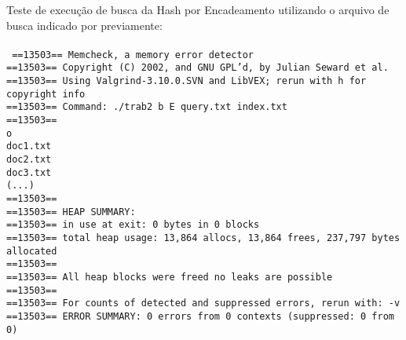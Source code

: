 \documentclass[
	11pt,				%
	oneside,			%
	a4paper,			%
	english,			%
	brazil,				%
	]{article}
\begin{document}
Teste de execução de busca da Hash por Encadeamento utilizando o arquivo de busca indicado por previamente:
\\\\
\texttt{
==13503== Memcheck, a memory error detector \\
==13503== Copyright (C) 2002, and GNU GPL'd, by Julian Seward et al. \\
==13503== Using Valgrind-3.10.0.SVN and LibVEX; rerun with \-h for copyright info \\
==13503== Command: ./trab2 \-b E query.txt index.txt \\
==13503==  \\
o \\
doc1.txt \\
doc2.txt \\
doc3.txt \\
(...) \\
==13503==  \\
==13503== HEAP SUMMARY: \\
==13503==     in use at exit: 0 bytes in 0 blocks \\
==13503==   total heap usage: 13,864 allocs, 13,864 frees, 237,797 bytes allocated \\
==13503==  \\
==13503== All heap blocks were freed \-\- no leaks are possible \\
==13503==  \\
==13503== For counts of detected and suppressed errors, rerun with: -v \\
==13503== ERROR SUMMARY: 0 errors from 0 contexts (suppressed: 0 from 0) \\
}
\end{document}
